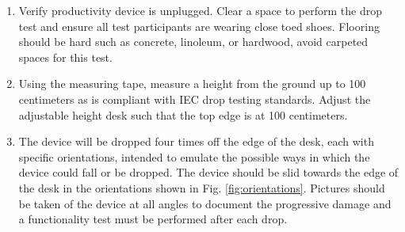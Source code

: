 \begin{enumerate}
\def\labelenumi{\arabic{enumi}.}
\item
  Verify productivity device is unplugged. Clear a space to perform the
  drop test and ensure all test participants are wearing close toed
  shoes. Flooring should be hard such as concrete, linoleum, or
  hardwood, avoid carpeted spaces for this test.
\item
  Using the measuring tape, measure a height from the ground up to 100
  centimeters as is compliant with IEC drop testing standards. Adjust
  the adjustable height desk such that the top edge is at 100
  centimeters.
\item
  The device will be dropped four times off the edge of the desk, each
  with specific orientations, intended to emulate the possible ways in
  which the device could fall or be dropped. The device should be slid
  towards the edge of the desk in the orientations shown in Fig.
  \ref{fig:orientations}. Pictures
  should be taken of the device at all angles to document the
  progressive damage and a functionality test must be performed after
  each drop.


\end{enumerate}
